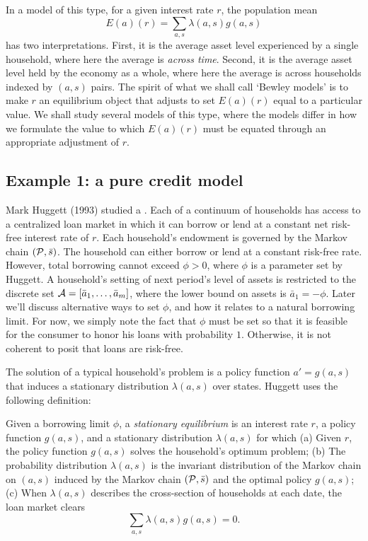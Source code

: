 In a model of this type, for a given interest rate $r$,  the population mean
$$ E(a)(r) =  \sum_{a,s} \lambda(a,s) g(a,s) $$
has two interpretations. First, it is the average asset level experienced by a single
household, where here the average is {\it across time}.  Second, it is the
average asset level held by the economy as a whole, where here the average is
across households indexed by $(a,s)$ pairs.  The spirit of what we shall call `Bewley models'
is to make  $r$ an equilibrium object that adjusts to set  $E (a)(r)$  equal to a particular value.
 We shall study
several models of this type, where the models differ in how we formulate the value to which $E(a)(r)$ must be equated through
an appropriate adjustment of $r$.%


\subsection{Example 1: a pure credit model}
 Mark Huggett (1993) studied a .
 Each of a continuum of  households has
access to a centralized loan market in which it can borrow or lend
at a constant net risk-free interest rate of $r$.  Each
household's endowment is governed by the Markov chain $({\cal P},
\bar s)$. The household can either borrow or lend at a constant
risk-free rate. However, total borrowing cannot exceed $\phi >0$,
where $\phi$ is a parameter set by Huggett.
 A household's
setting of next period's level of assets is restricted
to the discrete set ${\cal A} = [\bar a_1, \ldots, \bar a_m]$, where
the lower bound on assets is $\bar a_1 = -\phi$.  Later we'll discuss
alternative ways to set $\phi$, and how it relates to
a natural borrowing limit.
For now, we simply  note  the fact that  $\phi$ must be set so that it is feasible for the consumer
to  honor his loans with probability $1$.  Otherwise, it is not coherent to posit that loans are risk-free.


The solution of a typical household's problem is a policy
function $a' = g(a,s)$ that induces a stationary
distribution $\lambda(a,s)$ over states.
Huggett uses the following definition:

\medskip{} Given a borrowing limit $\phi$, a {\it stationary equilibrium\/}
is an interest rate $r$, a policy function $g(a,s)$, and a
 stationary distribution $\lambda(a,s)$ for which
\medskip
\noindent(a) Given $r$, the policy function $g(a,s)$ solves the household's
optimum problem;
\medskip
\noindent(b) The probability distribution  $\lambda(a,s)$ is the invariant distribution of the Markov chain on $(a,s)$
induced by the Markov chain $({\cal P}, \bar s)$ and the optimal policy $g(a,s)$;
\medskip
\noindent(c) When $\lambda(a,s)$ describes the cross-section of households at each date, the loan market clears
$$ \sum_{a,s} \lambda(a,s) g(a,s) = 0 .$$



